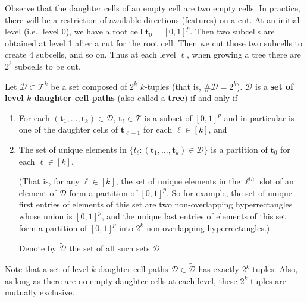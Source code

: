 Observe that the daughter cells of an empty cell are two empty cells. In practice, there will be a restriction of available directions (features) on a cut. At an initial level (i.e., level 0), we have a root cell \(\boldsymbol{t}_0 = [0,1]^p\). Then two subcells are obtained at level 1 after a cut for the root cell. Then we cut those two subcells to create 4 subcells, and so on. Thus at each level \(\ell\), when growing a tree there are \(2^\ell\) subcells to be cut.

\begin{definition}

Let \(\mathcal{D} \subset \mathcal{T}^k  \) be a set composed of \(2^k\) \(k\)-tuples (that is, \(\# \mathcal{D} = 2^k\)). \(\mathcal{D}\) is a \textbf{set of level \(k\) daughter cell paths} (also called a \textbf{tree}) if and only if 

\begin{enumerate}

\item For each \((\boldsymbol{t}_1, \ldots, \boldsymbol{t}_k) \in \mathcal{D}\), \(\boldsymbol{t}_\ell \in \mathcal{T}\) is a subset of \([0, 1]^p\) and in particular is one of the daughter cells of \(\boldsymbol{t}_{\ell - 1}\) for each \(\ell \in [k]\), and

\item The set of unique elements in \(\{t_\ell: (\boldsymbol{t}_1, \ldots, \boldsymbol{t}_k) \in \mathcal{D}\}\) is a partition of \(\boldsymbol{t}_0\) for each \(\ell \in [k]\).

(That is, for any \(\ell \in [k]\), the set of unique elements in the \(\ell^{th}\) slot of an element of \(\mathcal{D}\) form a partition of \([0, 1]^p\). So for example, the set of unique first entries of elements of this set are two non-overlapping hyperrectangles whose union is \([0, 1]^p\), and the unique last entries of elements of this set form a partition of \([0, 1]^p\) into \(2^k\) non-overlapping hyperrectangles.) 

Denote by \(\tilde{\mathcal{D}}\) the set of all such sets \(\mathcal{D}\).

\end{enumerate}

\end{definition}

Note that a set of level \(k\) daughter cell paths \(\mathcal{D} \in \tilde{\mathcal{D}}\) has exactly \(2^k\) tuples. Also, as long as there are no empty daughter cells at each level, these \(2^k\) tuples are mutually exclusive.

